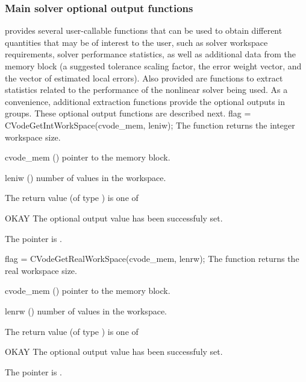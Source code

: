\subsubsection{Main solver optional output functions}
{\cvode} provides several user-callable functions that can be used to obtain
different quantities that may be of interest to the user, such as solver workspace
requirements, solver performance statistics, as well as additional data from
the {\cvode} memory block (a suggested tolerance scaling factor, the error weight
vector, and the vector of estimated local errors). Also provided are functions to
extract statistics related to the performance of the {\cvode} nonlinear solver
being used. As a convenience, additional extraction functions provide the optional 
outputs in groups.
These optional output functions are described next.
{
  flag = CVodeGetIntWorkSpace(cvode\_mem, leniw);
}
{
  The function  returns the
  {\cvode} integer workspace size.
}
{
  \begin{args}
  \item[cvode\_mem] ()
    pointer to the {\cvode} memory block.
  \item[leniw] ()
    number of  values in the {\cvode} workspace.
  \end{args}
}
{
  The return value  (of type ) is one of
  \begin{args}
  \item[OKAY] 
    The optional output value has been successfuly set.
  \item[\Id{CVG\_NO\_MEM}]
    The  pointer is .
  \end{args}
}
{}
{
  flag = CVodeGetRealWorkSpace(cvode\_mem, lenrw);
}
{
  The function  returns the
  {\cvode} real workspace size.
}
{
  \begin{args}
  \item[cvode\_mem] ()
    pointer to the {\cvode} memory block.
  \item[lenrw] ()
    number of  values in the {\cvode} workspace.
  \end{args}
}
{
  The return value  (of type ) is one of
  \begin{args}
  \item[OKAY] 
    The optional output value has been successfuly set.
  \item[\Id{CVG\_NO\_MEM}]
    The  pointer is .
  \end{args}
}
